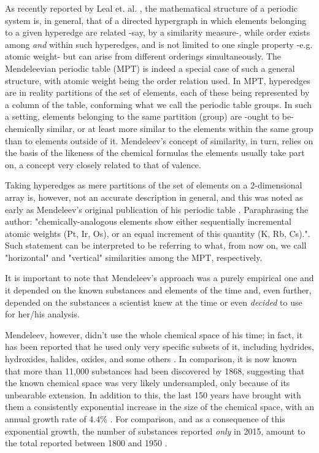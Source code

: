 \documentclass[]{article}
\begin{document}
As recently reported by Leal et. al. \cite{formalStructPS}, the mathematical structure of a periodic system is, in general, that of a directed hypergraph in which elements belonging to a given hyperedge are related -say, by a similarity measure-, while order exists among \textit{and} within such hyperedges, and is not limited to one single property -e.g. atomic weight- but can arise from different orderings simultaneously. The Mendeleevian periodic table (MPT) is indeed a special case of such a general structure, with atomic weight being the order relation used. In MPT, hyperedges are in reality partitions of the set of elements, each of these being represented by a column of the table, conforming what we call the periodic table groups. In such a setting, elements belonging to the same partition (group) are -ought to be- chemically similar, or at least more similar to the elements within the same group than to elements outside of it. Mendeleev's concept of similarity, in turn, relies on the basis of the likeness of the chemical formulas the elements usually take part on, a concept very closely related to that of valence.

Taking hyperedges as mere partitions of the set of elements on a 2-dimensional array is, however, not an accurate description in general, and this was noted as early as Mendeleev's original publication of his periodic table \cite{originalMendeleev}. Paraphrasing the author: "chemically-analogous elements show either sequentially incremental atomic weights (Pt, Ir, Os), or an equal increment of this quantity (K, Rb, Cs).". Such statement can be interpreted to be referring to what, from now on, we call "horizontal" and "vertical" similarities among the MPT, respectively. 

It is important to note that Mendeleev's approach was a purely empirical one and it depended on the known substances and elements of the time and, even further, depended on the substances a scientist knew at the time or even \textit{decided} to use for her/his analysis. 

Mendeleev, however, didn't use the whole chemical space of his time; in fact, it has been reported that he used only very specific subsets of it, including hydrides, hydroxides, halides, oxides, and some others \cite{mendeleevSelectWritings}. In comparison, it is now known that more than 11,000 substances had been discovered by 1868, suggesting that the known chemical space was very likely undersampled, only because of its unbearable extension. In addition to this, the last 150 years have brought with them a consistently exponential increase in the size of the chemical space, with an annual growth rate of 4.4\% \cite{exponentGrowth}. For comparison, and as a consequence of this exponential growth, the number of substances reported \textit{only} in 2015, amount to the total reported between 1800 and 1950 \cite{Restrepo_2019}.
\end{document}
